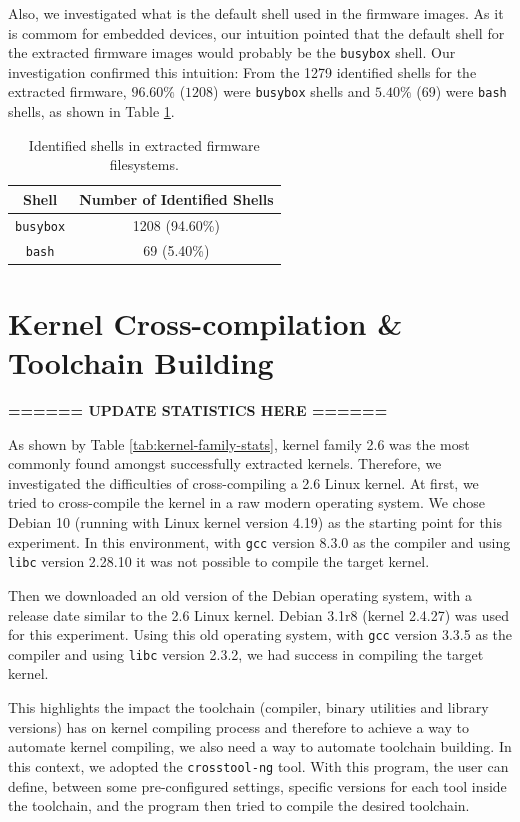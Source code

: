 Also, we investigated what is the default shell used in the firmware images. As it is commom for embedded devices, our intuition pointed that the default shell for the extracted firmware images would probably be the {\tt busybox} shell. Our investigation confirmed this intuition: From the 1279 identified shells for the extracted firmware, $96.60\%$ ($1208$) were {\tt busybox} shells and $5.40\%$ (69) were {\tt bash} shells, as shown in Table \ref{tab:shell-count}.

\begin{table}[h]
\centering
\caption{Identified shells in extracted firmware filesystems.}
\begin{tabular}{cc}
\hline
\textbf{Shell} & \textbf{Number of Identified Shells} \\ \hline
{\tt busybox}        & 1208 (94.60\%)              \\
{\tt bash}           & 69 (5.40\%)                 \\ \hline
\end{tabular}
\label{tab:shell-count}
\end{table}

\section{Kernel Cross-compilation \& Toolchain Building}

\textbf{====== UPDATE STATISTICS HERE ======}

As shown by Table \ref{tab:kernel-family-stats}, kernel family 2.6 was the most commonly found amongst successfully extracted kernels. Therefore, we investigated the difficulties of cross-compiling a 2.6 Linux kernel. At first, we tried to cross-compile the kernel in a raw modern operating system. We chose Debian 10 (running with Linux kernel version 4.19) as the starting point for this experiment. In this environment, with {\tt gcc} version 8.3.0 as the compiler and using {\tt libc} version 2.28.10 it was not possible to compile the target kernel.

Then we downloaded an old version of the Debian operating system, with a release date similar to the 2.6 Linux kernel. Debian 3.1r8 (kernel 2.4.27) was used for this experiment. Using this old operating system, with {\tt gcc} version 3.3.5 as the compiler and using {\tt libc} version 2.3.2, we had success in compiling the target kernel.

This highlights the impact the toolchain (compiler, binary utilities and library versions) has on kernel compiling process and therefore to achieve a way to automate kernel compiling, we also need a way to automate toolchain building. In this context, we adopted the {\tt crosstool-ng} tool. With this program, the user can define, between some pre-configured settings, specific versions for each tool inside the toolchain, and the program then tried to compile the desired toolchain.

